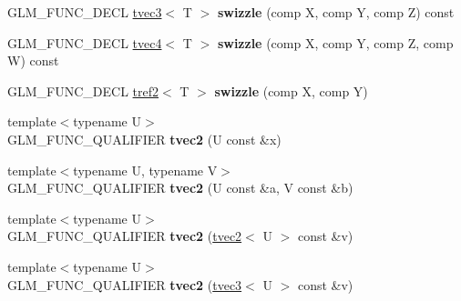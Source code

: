 \begin{DoxyCompactItemize}
\item 
\hypertarget{structglm_1_1detail_1_1tvec2_aeaf8442e0128983acffe4c8f180a4afa}{G\-L\-M\-\_\-\-F\-U\-N\-C\-\_\-\-D\-E\-C\-L \hyperlink{structglm_1_1detail_1_1tvec3}{tvec3}$<$ T $>$ {\bfseries swizzle} (comp X, comp Y, comp Z) const }\label{structglm_1_1detail_1_1tvec2_aeaf8442e0128983acffe4c8f180a4afa}

\item 
\hypertarget{structglm_1_1detail_1_1tvec2_ab57980ed556297a8698f995d20336d07}{G\-L\-M\-\_\-\-F\-U\-N\-C\-\_\-\-D\-E\-C\-L \hyperlink{structglm_1_1detail_1_1tvec4}{tvec4}$<$ T $>$ {\bfseries swizzle} (comp X, comp Y, comp Z, comp W) const }\label{structglm_1_1detail_1_1tvec2_ab57980ed556297a8698f995d20336d07}

\item 
\hypertarget{structglm_1_1detail_1_1tvec2_a3a37005b6484b97af0d7b10de75303cf}{G\-L\-M\-\_\-\-F\-U\-N\-C\-\_\-\-D\-E\-C\-L \hyperlink{structglm_1_1detail_1_1tref2}{tref2}$<$ T $>$ {\bfseries swizzle} (comp X, comp Y)}\label{structglm_1_1detail_1_1tvec2_a3a37005b6484b97af0d7b10de75303cf}

\item 
\hypertarget{structglm_1_1detail_1_1tvec2_acec9b5852d2e93f20ff7817999b01d73}{{\footnotesize template$<$typename U$>$ }\\G\-L\-M\-\_\-\-F\-U\-N\-C\-\_\-\-Q\-U\-A\-L\-I\-F\-I\-E\-R {\bfseries tvec2} (U const \&x)}\label{structglm_1_1detail_1_1tvec2_acec9b5852d2e93f20ff7817999b01d73}

\item 
\hypertarget{structglm_1_1detail_1_1tvec2_aad60307a2db67b5990d60e9fae0f3bee}{{\footnotesize template$<$typename U, typename V$>$ }\\G\-L\-M\-\_\-\-F\-U\-N\-C\-\_\-\-Q\-U\-A\-L\-I\-F\-I\-E\-R {\bfseries tvec2} (U const \&a, V const \&b)}\label{structglm_1_1detail_1_1tvec2_aad60307a2db67b5990d60e9fae0f3bee}

\item 
\hypertarget{structglm_1_1detail_1_1tvec2_ac62143e85db688ebdd281d60c237dda7}{{\footnotesize template$<$typename U$>$ }\\G\-L\-M\-\_\-\-F\-U\-N\-C\-\_\-\-Q\-U\-A\-L\-I\-F\-I\-E\-R {\bfseries tvec2} (\hyperlink{structglm_1_1detail_1_1tvec2}{tvec2}$<$ U $>$ const \&v)}\label{structglm_1_1detail_1_1tvec2_ac62143e85db688ebdd281d60c237dda7}

\item 
\hypertarget{structglm_1_1detail_1_1tvec2_a7ffc001d6841e90b8f9cffd818d61019}{{\footnotesize template$<$typename U$>$ }\\G\-L\-M\-\_\-\-F\-U\-N\-C\-\_\-\-Q\-U\-A\-L\-I\-F\-I\-E\-R {\bfseries tvec2} (\hyperlink{structglm_1_1detail_1_1tvec3}{tvec3}$<$ U $>$ const \&v)}\label{structglm_1_1detail_1_1tvec2_a7ffc001d6841e90b8f9cffd818d61019}


\end{DoxyCompactItemize}
